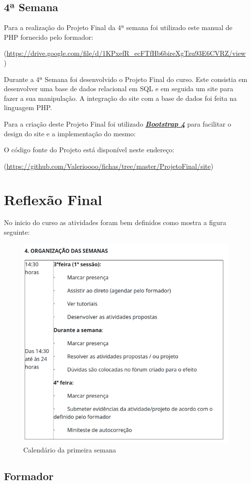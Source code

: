 \documentclass[14pt]{article}
\begin{document}
\subsection{4ª Semana}

Para a realização do Projeto Final da 4ª semana foi utilizado este manual de PHP fornecido pelo formador:

(\url{https://drive.google.com/file/d/1KPxefR_ecFTfHb6bireXgTzu93E6CVRZ/view})

Durante a 4ª Semana foi desenvolvido o Projeto Final do curso.
Este consistia em desenvolver uma base de dados relacional em SQL e em seguida um site para fazer a sua manipulação.
A integração do site com a base de dados foi feita na linguagem PHP.

Para a criação deste Projeto Final foi utilizado \href{https://getbootstrap.com/}{\textbf{\textit{Bootstrap 4}}} para facilitar o design do site e a implementação do mesmo:


O código fonte do Projeto está disponível neste endereço:

(\url{https://github.com/Valerioooo/fichas/tree/master/ProjetoFinal/site})


\newpage
\section{Reflexão Final}

No inicio do curso as atividades foram bem definidos como mostra a figura seguinte:

\begin{figure}[H]
    \centering
    \includegraphics[width=0.45\linewidth]{cal.png}
    \caption{Calendário da primeira semana}
    \label{fig:cal}
\end{figure}


\subsection{Formador}
\end{document}
